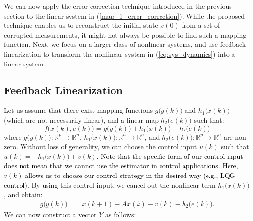 We can now apply the error correction technique introduced in the previous section to the linear system in (\ref{map_1_error_correction}). While the proposed technique enables us to reconstruct the initial state $x(0)$ from a set of corrupted measurements, it might not always be possible to find such a mapping function. Next, we focus on a larger class of nonlinear systems, and use feedback linearization to transform the nonlinear system in (\ref{eq:sys_dynamics}) into a linear system.



\subsection{Feedback Linearization}
Let us assume that there exist mapping functions $g\big(y(k)\big)$ and $h_1\big(x(k)\big)$ (which are not necessarily linear), and a linear map $h_2\big(e(k)\big)$ such that:
\begin{equation}\label{eq:form_feedback}
f\big(x(k),e(k)\big)= g\big(y(k)\big) + h_1\big(x(k)\big) + h_2\big(e(k)\big)	
\end{equation}
where $g\big(y(k)\big): \mathbb{R}^p \rightarrow \mathbb{R}^n$, $h_1\big(x(k)\big): \mathbb{R}^n \rightarrow \mathbb{R}^n$, and $h_2\big(e(k)\big): \mathbb{R}^p \rightarrow \mathbb{R}^n$ are non-zero.
Without loss of generality, we can choose the control input $u(k)$ such that $u(k)=-h_1 \big(x(k) \big)+v(k)$. \noindent \textcolor{black}{Note that the specific form of our control input does not mean that we cannot use the estimator in control applications. Here, $v(k)$ allows us to choose our control strategy in the desired way (e.g., LQG control).} By using this control input, we cancel out the nonlinear term $h_1\big(x(k)\big)$, and obtain:
\begin{equation}
\begin{aligned}
	g\big(y(k)\big) &= x(k+1) - A x(k) - v(k) - h_2\big(e(k)\big).\nonumber
\end{aligned}
\end{equation}
We can now construct a vector $Y$ as follows:
